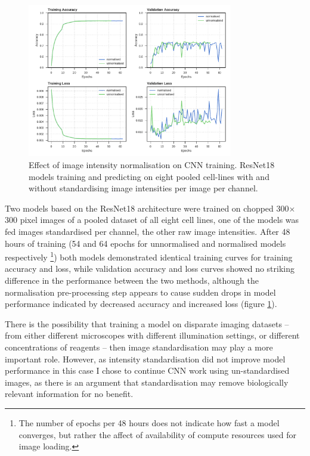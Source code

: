 \documentclass[a4paper,11pt,twoside,openright]{scrbook}
\begin{document}
\begin{figure}
    \includegraphics[width=0.8\textwidth]{ch2imgNorm}
    \captionsetup{width=0.8\textwidth}
    \caption[Effect of image intensity normalisation on CNN training]{Effect of image intensity normalisation on CNN training. ResNet18 models training and predicting on eight pooled cell-lines with and without standardising image intensities per image per channel.}
    \label{figure:img_norm}
\end{figure}


Two models based on the ResNet18 architecture were trained on chopped 300$\times$300 pixel images of a pooled dataset of all eight cell lines, one of the models was fed images standardised per channel, the other raw image intensities.
After 48 hours of training (54 and 64 epochs for unnormalised and normalised models respectively \footnote{The number of epochs per 48 hours does not indicate how fast a model converges, but rather the affect of availability of compute resources used for image loading.}) both models demonstrated identical training curves for training accuracy and loss, while validation accuracy and loss curves showed no striking difference in the performance between the two methods, although the normalisation pre-processing step appears to cause sudden drops in model performance indicated by decreased accuracy and increased loss (figure \ref{figure:img_norm}).

There is the possibility that training a model on disparate imaging datasets -- from either different microscopes with different illumination settings, or different concentrations of reagents -- then image standardisation may play a more important role.
However, as intensity standardisation did not improve model performance in this case I chose to continue CNN work using un-standardised images, as there is an argument that standardisation may remove biologically relevant information for no benefit.
\end{document}
